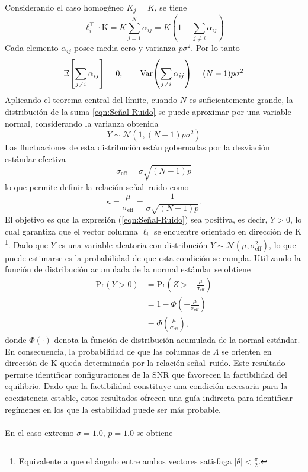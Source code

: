 Considerando el caso homogéneo $K_j=K$, se tiene
$$\ell_i^\top\cdot\mathrm{K} = K\sum_{j=1}^{N}\alpha_{ij} = K\left(1+\sum_{j\neq i}\alpha_{ij}\right)$$
Cada elemento $\alpha_{ij}$ posee media cero y varianza $p\sigma^2$. Por lo tanto
$$
\mathbb{E}\!\left[\sum_{j\neq i}\alpha_{ij}\right]=0,
\qquad
\mathrm{Var}\!\left(\sum_{j\neq i}\alpha_{ij}\right)=(N-1)p\sigma^2
$$
Aplicando el teorema central del límite, cuando $N$ es suficientemente grande, la distribución de la suma \eqref{eqn:Señal-Ruido} se puede aproximar por una variable normal, considerando la varianza obtenida
$$
Y\sim\mathcal{N}\!\left(1,(N-1)p\sigma^2\right)
$$
Las fluctuaciones de esta distribución están gobernadas por la desviación estándar efectiva
$$
\sigma_{\text{eff}}=\sigma\sqrt{(N-1)p}
$$
lo que permite definir la relación señal–ruido como
\begin{equation}\label{eqn:SNR}
	\kappa=\frac{\mu}{\sigma_{\text{eff}}}
	=\frac{1}{\sigma\sqrt{(N-1)p}}.
\end{equation}
El objetivo es que la expresión (\ref{eqn:Señal-Ruido}) sea positiva, es decir, $Y>0$, lo cual garantiza que el vector columna $\ell_i$ se encuentre orientado en dirección de $\mathrm{K}$\footnote{Equivalente a que el ángulo entre ambos vectores satisfaga $|\theta|<\frac{\pi}{2}$.}. Dado que $Y$ es una variable aleatoria con distribución $Y\sim\mathcal{N}(\mu,\sigma_{\text{eff}}^2)$, lo que puede estimarse es la probabilidad de que esta condición se cumpla. Utilizando la función de distribución acumulada de la normal estándar se obtiene
\begin{align*}
	\text{Pr}(Y>0)
	&=\text{Pr}\left(Z>-\frac{\mu}{\sigma_{\text{eff}}}\right)\\
	&=1-\Phi\left(-\frac{\mu}{\sigma_{\text{eff}}}\right)\\
	&=\Phi\left(\frac{\mu}{\sigma_{\text{eff}}}\right),
\end{align*}
donde $\Phi(\cdot)$ denota la función de distribución acumulada de la normal estándar. En consecuencia, la probabilidad de que las columnas de $\Lambda$ se orienten en dirección de $\mathrm{K}$ queda determinada por la relación señal–ruido. Este resultado permite identificar configuraciones de la SNR que favorecen la factibilidad del equilibrio. Dado que la factibilidad constituye una condición necesaria para la coexistencia estable, estos resultados ofrecen una guía indirecta para identificar regímenes en los que la estabilidad puede ser más probable. \\
\\
En el caso extremo $\sigma=1.0$, $p=1.0$ se obtiene

